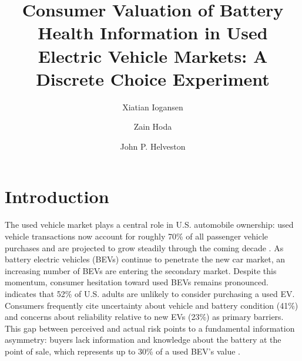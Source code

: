 \documentclass[a4paper,fleqn]{cas-sc}   %
\begin{document}
\let\WriteBookmarks\relax
\def\floatpagepagefraction{1}
\def\textpagefraction{.001}
\shorttitle{}

\title [mode = title]{Consumer Valuation of Battery Health Information in Used Electric Vehicle Markets: A Discrete Choice Experiment
}


\author[1]{Xiatian {Iogansen}}
\fnmark[1]

\author[1]{Zain {Hoda}}
\fnmark[2]

\author[1]{John P. {Helveston}}
\fnmark[3]

\address[1]{Department of Engineering Management and Systems Engineering, George Washington University, Washington D.C., USA}





\maketitle
\renewcommand{\baselinestretch}{1}\normalsize
\section{Introduction}
\label{section:intro}

The used vehicle market plays a central role in U.S. automobile ownership: used vehicle transactions now account for roughly 70\% of all passenger vehicle purchases and are projected to grow steadily through the coming decade \parencite{marketresearchfutureUnitedStatesUsed2025}. As battery electric vehicles (BEVs) continue to penetrate the new car market, an increasing number of BEVs are entering the secondary market. Despite this momentum, consumer hesitation toward used BEVs remains pronounced. \textcite{fernandesUSUnderstandingConsumer2023} indicates that 52\% of U.S. adults are unlikely to consider purchasing a used EV. Consumers frequently cite uncertainty about vehicle and battery condition (41\%) and concerns about reliability relative to new EVs (23\%) as primary barriers. This gap between perceived and actual risk points to a fundamental information asymmetry: buyers lack information and knowledge about the battery at the point of sale, which represents up to 30\% of a used BEV's value \parencite{boudwayBatteriesElectricCars2020}.
\end{document}

